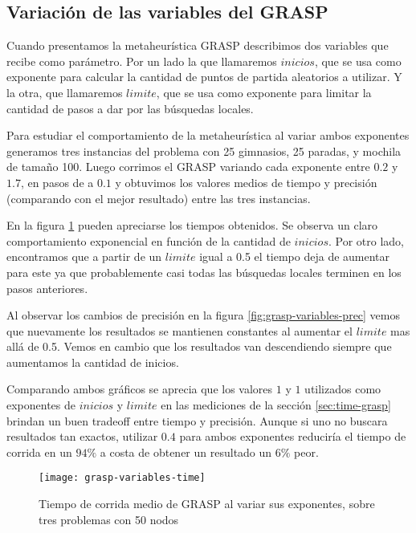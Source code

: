 \subsection{Variación de las variables del GRASP}

Cuando presentamos la metaheurística GRASP describimos dos variables que recibe como parámetro.
Por un lado la que llamaremos $inicios$, que se usa como exponente para calcular la cantidad de puntos de partida aleatorios a utilizar.
Y la otra, que llamaremos $limite$, que se usa como exponente para limitar la cantidad de pasos a dar por las búsquedas locales.

Para estudiar el comportamiento de la metaheurística al variar ambos exponentes generamos tres instancias del problema con 25 gimnasios,
25 paradas, y mochila de tamaño 100. Luego corrimos el GRASP variando cada exponente entre $0.2$ y $1.7$, en pasos de a $0.1$ y obtuvimos
los valores medios de tiempo y precisión (comparando con el mejor resultado) entre las tres instancias.

En la figura \ref{fig:grasp-variables-time} pueden apreciarse los tiempos obtenidos.
Se observa un claro comportamiento exponencial en función de la cantidad de $inicios$.
Por otro lado, encontramos que a partir de un $limite$ igual a 0.5 el tiempo deja de aumentar para este ya que
probablemente casi todas las búsquedas locales terminen en los pasos anteriores.

Al observar los cambios de precisión en la figura \ref{fig:grasp-variables-prec} vemos que nuevamente los resultados se mantienen constantes
al aumentar el $limite$ mas allá de 0.5. Vemos en cambio que los resultados van descendiendo siempre que aumentamos
la cantidad de inicios.

Comparando ambos gráficos se aprecia que los valores $1$ y $1$ utilizados como exponentes de $inicios$ y $limite$ en las mediciones
de la sección \ref{sec:time-grasp} brindan un buen tradeoff entre tiempo y precisión. Aunque si uno no buscara resultados tan exactos,
utilizar $0.4$ para ambos exponentes reduciría el tiempo de corrida en un $94\%$ a costa de obtener un resultado un $6\%$ peor.

\begin{figure}[H]
    \centering
    \texttt{[image: grasp-variables-time]}
    \caption{Tiempo de corrida medio de GRASP al variar sus exponentes, sobre tres problemas con 50 nodos}
    \label{fig:grasp-variables-time}
\end{figure}

